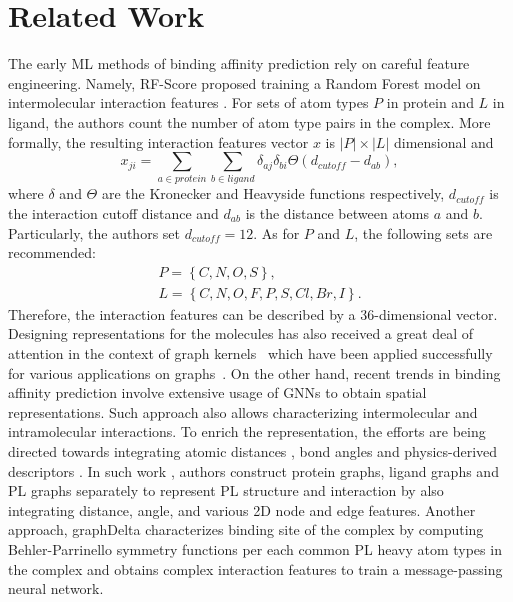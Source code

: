 \documentclass[nohyperref]{article}
\theoremstyle{plain}
\theoremstyle{definition}
\theoremstyle{remark}
\begin{document}
\section{Related Work}
The early ML methods of binding affinity prediction rely on careful feature engineering. Namely, RF-Score proposed training a Random Forest model on intermolecular interaction features \cite{mlfeatures}. For sets of atom types $P$ in protein and $L$ in ligand, the authors count the number of atom type pairs in the complex. More formally, the resulting interaction features vector $x$ is $|P| \times |L|$ dimensional and 
\begin{equation*}
    x_{ji} = \sum_{a \in protein} \sum_{b \in ligand} \delta_{aj} \delta_{bi} \Theta \left(d_{cutoff} - d_{ab} \right),
\end{equation*}
where $\delta$ and $\Theta$ are the Kronecker and Heavyside functions respectively, $d_{cutoff}$ is the interaction cutoff distance and $d_{ab}$ is the distance between atoms $a$ and $b$. Particularly, the authors set $d_{cutoff} = 12$. As for $P$ and $L$, the following sets are recommended:
\begin{gather*}
    P = \left\{ C, N, O, S \right\}, \\
    L = \left\{ C, N, O, F, P, S, Cl, Br, I \right\}.
\end{gather*}
Therefore, the interaction features can be described by a 36-dimensional vector. Designing representations for the molecules has also received a great deal of attention in the context of graph kernels~\cite{kriege2020survey, ivanov2018anonymous} which have been applied successfully for various applications on graphs~\cite{sharaev2018learning, ivanov2018learning}. 
On the other hand, recent trends in binding affinity prediction involve extensive usage of GNNs to obtain spatial representations. 
Such approach also allows characterizing intermolecular and intramolecular interactions. 
To enrich the representation, the efforts are being directed towards integrating atomic distances \cite{lim2019}, bond angles and physics-derived descriptors \cite{moon2022pignet}. 
In such work \cite{jiang2021interactiongraphnet}, authors construct protein graphs, ligand graphs and PL graphs separately to represent PL structure and interaction by also integrating distance, angle, and various 2D node and edge features. 
Another approach, graphDelta \cite{karlov2020graphdelta} characterizes binding site of the complex by computing Behler-Parrinello symmetry functions \cite{bps} per each common PL heavy atom types in the complex and obtains complex interaction features to train a message-passing neural network.
\end{document}

